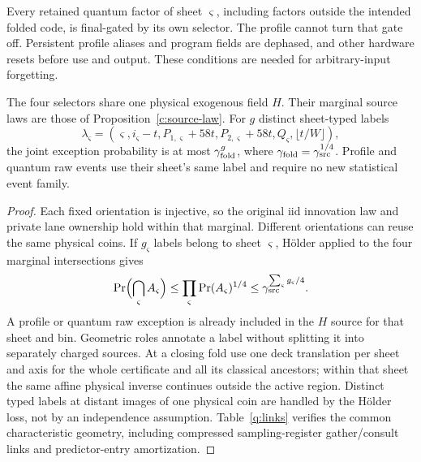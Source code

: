 Every retained quantum factor of sheet \(\varsigma\), including factors
outside the intended folded code, is final-gated by its own selector.
The profile cannot turn that gate off. Persistent profile aliases and
program fields are dephased, and other hardware resets before use and
output. These conditions are needed for arbitrary-input forgetting.

\begin{proposition}\label{c:oriented-source}
The four selectors share one physical exogenous field \(H\). Their
marginal source laws are those of Proposition~\ref{c:source-law}.
For \(g\) distinct sheet-typed labels
\[
 \lambda_\varsigma=(\varsigma,i_\varsigma-t,
       P_{1,\varsigma}+58t,P_{2,\varsigma}+58t,Q_\varsigma,\lfloor t/W\rfloor),
\]
the joint exception probability is at most
\(\gamma_{\rm fold}^g\), where \(\gamma_{\rm fold}=\gamma_{\rm src}^{1/4}\).
Profile and quantum raw events use their sheet's same label and require
no new statistical event family.
\end{proposition}
\begin{proof}
Each fixed orientation is injective, so the original iid innovation law
and private lane ownership hold within that marginal. Different
orientations can reuse the same physical coins. If \(g_\varsigma\) labels
belong to sheet \(\varsigma\), Hölder applied to the four marginal
intersections gives
\[
 \Pr\Bigl(\bigcap_\varsigma A_\varsigma\Bigr)
 \le\prod_\varsigma\Pr(A_\varsigma)^{1/4}
 \le\gamma_{\rm src}^{\sum_\varsigma g_\varsigma/4}.
\]
A profile or quantum raw exception is already included in the \(H\)
source for that sheet and bin. Geometric roles annotate a label without
splitting it into separately charged sources. At a closing fold use one
deck translation per sheet and axis for the whole certificate and all
its classical ancestors; within that sheet the same affine physical
inverse continues outside the active region. Distinct typed labels at
distant images of one physical coin are handled by the Hölder loss,
not by an independence assumption. Table~\ref{q:links} verifies the common characteristic geometry, including
compressed sampling-register gather/consult links and predictor-entry amortization.
\end{proof}

